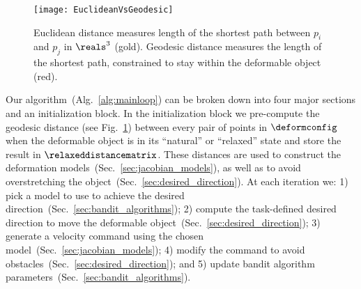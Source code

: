 \begin{figure}[ht]
    \centering
    \texttt{[image: EuclideanVsGeodesic]}
    \caption{Euclidean distance measures length of the shortest path between $p_i$ and $p_j$ in $\reals^3$ (gold). Geodesic distance measures the length of the shortest path, constrained to stay within the deformable object (red).}
    \label{fig:distance}
\end{figure}

Our algorithm~(Alg.~\ref{alg:mainloop}) can be broken down into four major sections and an initialization block. In the initialization block we pre-compute the geodesic distance (see Fig.~\ref{fig:distance}) between every pair of points in $\deformconfig$ when the deformable object is in its ``natural'' or ``relaxed'' state and store the result in $\relaxeddistancematrix$. These distances are used to construct the deformation models~(Sec.~\ref{sec:jacobian_models}), as well as to avoid overstretching the object~(Sec.~\ref{sec:desired_direction}).
At each iteration we: 
1) pick a model to use to achieve the desired direction~(Sec.~\ref{sec:bandit_algorithms}); 
2) compute the task-defined desired direction to move the deformable object~(Sec.~\ref{sec:desired_direction}); 
3) generate a velocity command using the chosen model~(Sec.~\ref{sec:jacobian_models}); 
4) modify the command to avoid obstacles~(Sec.~\ref{sec:desired_direction});
and 5) update bandit algorithm parameters~(Sec.~\ref{sec:bandit_algorithms}).






